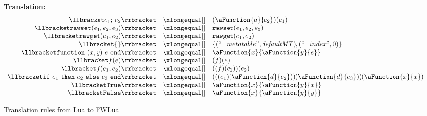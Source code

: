 \begin{figure}
\caption{Translation rules from Lua to FWLua}

{\bf Translation:~~~    } 
\label{fig:translation}
\[
\begin{array}{rclcl}
\translate{e_1{\tt ;}~e_2}{(\aFunction{a}{e_2})(e_1)}
\translate{{\tt rawset}(e_1,e_2,e_3)}{{\tt rawset}(e_1,e_2,e_3)}
\translate{{\tt rawget}(e_1,e_2)}{{\tt rawget}(e_1,e_2)}
\translate{
    \{\}
}{
   \{(``\_metatable", {\it defaultMT}),(``\_index", 0)\}  
}

\translate{{\tt function}~(x,y)~e~{\tt end}}{\aFunction{x}{\aFunction{y}{e}}}
\translate{f(e)}{(f)(e)}
\translate{f(e_1,e_2)}{((f)(e_1))(e_2)}
\translate{
    {\tt if}~e_1~{\tt then}~e_2~{\tt else}~e_3~{\tt end}
}{
    (((e_1)(\aFunction{d}{e_2}))(\aFunction{d}{e_3}))(\aFunction{x}{x})
}
\translate{\tt True}{\aFunction{x}{\aFunction{y}{x}}}
\translate{\tt False}{\aFunction{x}{\aFunction{y}{y}}}

\end{array}
\]
\end{figure}
